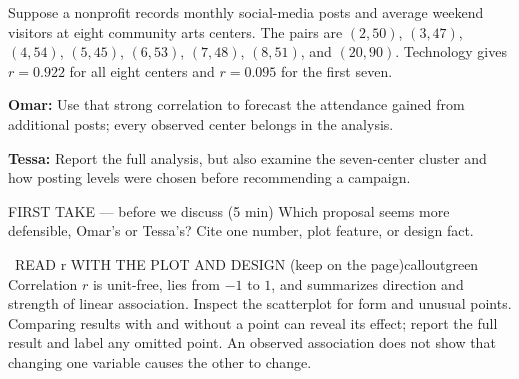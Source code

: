 \documentclass[11pt]{article}
\begin{document}


Suppose a nonprofit records monthly social-media posts and average weekend visitors at eight community arts centers. The pairs are $(2,50)$, $(3,47)$, $(4,54)$, $(5,45)$, $(6,53)$, $(7,48)$, $(8,51)$, and $(20,90)$. Technology gives $r=0.922$ for all eight centers and $r=0.095$ for the first seven.\par\smallskip \textbf{Omar:} Use that strong correlation to forecast the attendance gained from additional posts; every observed center belongs in the analysis.\par \textbf{Tessa:} Report the full analysis, but also examine the seven-center cluster and how posting levels were chosen before recommending a campaign.\par
\begin{center}
\end{center}
\begin{firsttakebox}{FIRST TAKE --- before we discuss (5 min)}
Which proposal seems more defensible, Omar's or Tessa's? Cite one number, plot feature, or design fact.
\workspace{0.85in}
\end{firsttakebox}

\begin{callout}{\IconBook\ READ r WITH THE PLOT AND DESIGN (keep on the page)}{calloutgreen}
Correlation $r$ is unit-free, lies from $-1$ to $1$, and summarizes direction and strength of linear association. Inspect the scatterplot for form and unusual points. Comparing results with and without a point can reveal its effect; report the full result and label any omitted point. An observed association does not show that changing one variable causes the other to change.
\end{callout}
\end{document}
